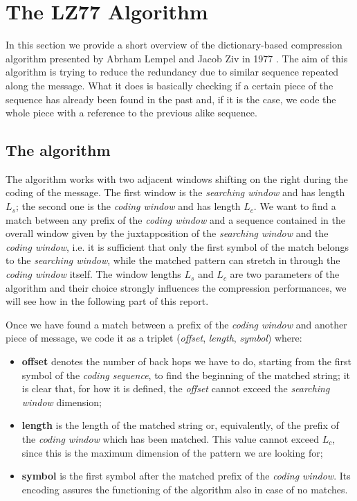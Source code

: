 \section{The LZ77 Algorithm} \label{sec:lz77}
In this section we provide a short overview of the dictionary-based compression algorithm presented by Abrham Lempel and Jacob Ziv in 1977 \cite{ziv1}. The aim of this algorithm is trying to reduce the redundancy due to similar sequence repeated along the message. What it does is basically checking if a certain piece of the sequence has already been found in the past and, if it is the case, we code the whole piece with a reference to the previous alike sequence.

\subsection{The algorithm} \label{subsec:lz77alg}
The algorithm works with two adjacent windows shifting on the right during the coding of the message. The first window is the \textit{searching window} and has length $L_s$; the second one is the \textit{coding window} and has length $L_c$. We want to find a match between any prefix of the \textit{coding window} and a sequence contained in the overall window given by the juxtapposition of the \textit{searching window} and the \textit{coding window}, i.e. it is sufficient that only the first symbol of the match belongs to the \textit{searching window}, while the matched pattern can stretch in through the \textit{coding window} itself. The window lengths $L_s$ and $L_c$ are two parameters of the algorithm and their choice strongly influences the compression performances, we will see how in the following part of this report.
 
Once we have found a match between a prefix of the \textit{coding window} and another piece of message, we code it as a triplet (\textit{offset}, \textit{length}, \textit{symbol}) where:
\begin{itemize}
\item
\textbf{offset} denotes the number of back hops we have to do, starting from the first symbol of the \textit{coding sequence}, to find the beginning of the matched string; it is clear that, for how it is defined, the \textit{offset} cannot exceed the \textit{searching window} dimension;

\item
\textbf{length} is the length of the matched string or, equivalently, of the prefix of the \textit{coding window} which has been matched. This value cannot exceed $L_c$, since this is the maximum dimension of the pattern we are looking for;

\item
\textbf{symbol} is the first symbol after the matched prefix of the \textit{coding window}. Its encoding assures the functioning of the algorithm also in case of no matches. 
\end{itemize}


